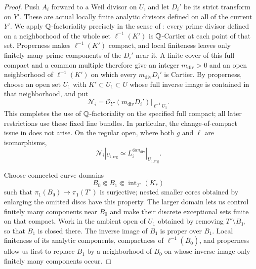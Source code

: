 \begin{proof}
Push \(A_i\) forward to a Weil divisor on \(U\), and let \(D_i'\) be
its strict transform on \(Y'\).  These are actual locally finite
analytic divisors defined on all of the current \(Y'\).  We apply
\(\mathbb{Q}\)-factoriality precisely in the sense of
\cite[Definition~2.38]{FujinoAnalyticMMP}: every prime divisor
defined on a neighborhood of the whole set \(\ell^{-1}(K')\)
is \(\mathbb{Q}\)-Cartier at each point of that set.  Properness makes
\(\ell^{-1}(K')\) compact, and local finiteness leaves only finitely
many prime components of the \(D_i'\) near it.  A finite cover of
this full compact and a common multiple therefore give an integer
\(m_{\mathrm{div}}>0\) and an open neighborhood of \(\ell^{-1}(K')\)
on which every \(m_{\mathrm{div}}D_i'\) is Cartier.  By properness,
choose an open set \(U_1\) with \(K'\subset U_1\subset U\) whose full
inverse image is contained in that neighborhood, and put
\[
 \mathcal N_i=\mathcal O_{Y'}(m_{\mathrm{div}}D_i')|_{\ell^{-1}U_1}.
\]
This completes the use of \(\mathbb{Q}\)-factoriality on the specified full
compact; all later restrictions use these fixed line bundles.
In particular, the change-of-compact issue in
\cite[Remark~2.39]{FujinoAnalyticMMP} does not arise.  On the
regular open, where both \(g\) and \(\ell\) are isomorphisms,
\begin{equation}\label{eq:curve-regular-bundles}
 \mathcal N_i|_{U_{1,\mathrm{reg}}}
 \simeq L_i^{\otimes m_{\mathrm{div}}}|_{U_{1,\mathrm{reg}}}.
\end{equation}

Choose connected curve domains
\[
 B_0\Subset B_1\Subset\operatorname{int}_{T^\circ}(K_*)
\]
such that \(\pi_1(B_0)\to\pi_1(T^\circ)\) is surjective; nested
smaller cores obtained by enlarging the omitted discs have this
property.  The larger domain lets us control finitely many components
near \(\overline B_0\) and make their discrete exceptional sets finite
on that compact.  Work in the ambient open of \(U_1\) obtained by removing
\(T^\circ\setminus B_1\), so that \(B_1\) is closed there.
The inverse image of \(B_1\) is proper over \(B_1\).
Local finiteness of its analytic components, compactness of
\(\ell^{-1}(\overline B_0)\), and properness allow us first to
replace \(B_1\) by a neighborhood of \(\overline B_0\) on whose
inverse image only finitely many components occur.


\end{proof}

